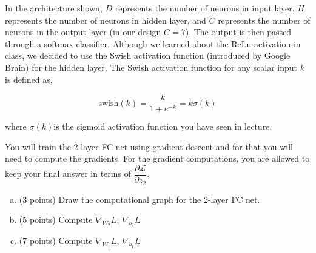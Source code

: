 \documentclass{article}
\begin{document}
In the architecture shown, $D$ represents the number of neurons in input layer, $H$ represents
the number of neurons in hidden layer, and $C$ represents the number of neurons in the output
layer (in our design $C = 7$). The output is then passed through a softmax classifier. Although
we learned about the ReLu activation in class, we decided to use the Swish activation function
(introduced by Google Brain) for the hidden layer. The Swish activation function for any
scalar input $k$ is defined as,

$$\text{swish}(k) = \dfrac{k}{1 + e^{-k}} = k \sigma(k)$$

where $\sigma(k)$is the sigmoid activation function you have seen in lecture.

You will train the 2-layer FC net using gradient descent and for that you will need to compute the gradients. For the gradient computations, you are allowed to keep your final answer in terms of $\dfrac{\partial \mathcal{L}}{\partial z_2}$. \newline 


\begin{enumerate}[(a)]

    \item (3 points) Draw the computational graph for the 2-layer FC net.
    
    \begin{shaded}
    
    \end{shaded}
    
    \item (5 points) Compute $\nabla_{W_2}L$, $\nabla_{b_2}L$
    
    \begin{shaded}
    \end{shaded}
    
    \item (7 points) Compute $\nabla_{W_1}L$, $\nabla_{b_1}L$
    
    \begin{shaded}
    \end{shaded}

\end{enumerate}
\end{document}
